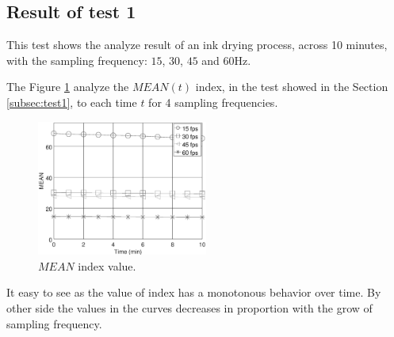 \documentclass[review]{elsarticle}
\begin{document}
\subsection{Result of test 1}
\label{subsec:resulttest1}
This test shows the analyze result of an ink drying process, across 10 minutes,
with the sampling frequency: $15$, $30$, $45$ and $60$Hz.

The Figure \ref{fig:MEANtest1} analyze the $MEAN(t)$ index,
in the test showed in the Section \ref{subsec:test1},
to each time $t$ for 4 sampling frequencies.
\begin{figure}[ht!]
    \centering
    \includegraphics[width=0.5\textwidth]{FPS_f11_rawMEAN.eps}
    \caption{$MEAN$ index value.}\label{fig:MEANtest1}
\end{figure}
It easy to see as the value of index has a monotonous 
behavior over time. By other side the values in the curves decreases in proportion with 
the grow of sampling frequency.
\end{document}
